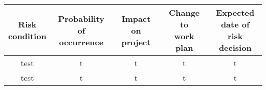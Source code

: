 \begin{flushleft}
\begin{tabular}{c|c|c|c|c}
\parbox[t]{2cm}{Risk\\condition} & \parbox[t]{2.5cm}{Probability\\of occurrence} & \parbox[t]{3cm}{Impact on\\project} & \parbox[t]{3cm}{Change to\\work plan} & \parbox[t]{2.4cm}{Expected\\date of risk\\decision}\\[1.6cm]

\hline

test&t&t&t&t\\
test&t&t&t&t
\end{tabular}
\end{flushleft}